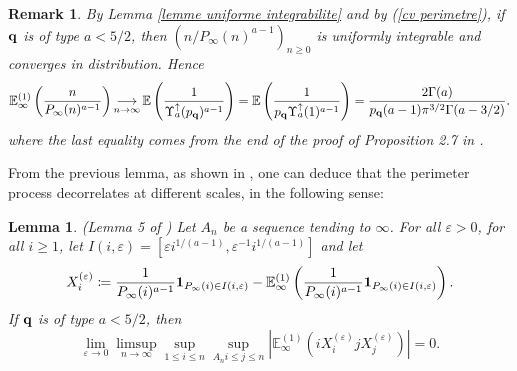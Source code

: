 \documentclass[11pt]{article}
\newtheorem{lemma}[theorem]{Lemma}
\newtheorem{remark}[theorem]{Remark}
\numberwithin{equation}{section}
\def\vp{\varepsilon}
\def\E{\mathbb{E}}
\begin{document}
\begin{remark}\label{remarque cv 1 sur P}
By Lemma \ref{lemme uniforme integrabilite} and by (\ref{cv perimetre}), if ${\bf q}$ is of type $a <5/2$, then $(n/P_\infty(n)^{a-1})_{n\ge 0}$ is uniformly integrable and converges in distribution. Hence
$$
\E^{(1)}_\infty \left(
\frac{n}{P_\infty(n)^{a-1}}
\right)
\mathop{\longrightarrow}\limits_{n\to \infty}
\E\left(
\frac{1}{\Upsilon^\uparrow_a(p_{\bf q})^{a-1}}
\right)
=\E\left(\frac{1}{p_{\bf q}\Upsilon^\uparrow_a(1)^{a-1}} \right)
=\frac{2\Gamma(a)}{p_{\bf q} (a-1) \pi^{3/2} \Gamma(a-3/2)}
.
$$
where the last equality comes from the end of the proof of Proposition 2.7 in \cite{Kam23}.
\end{remark}
From the previous lemma, as shown in \cite{BCM}, one can deduce that the perimeter process decorrelates at different scales, in the following sense:
\begin{lemma}\label{Lemme decorrelation}(Lemma 5 of \cite{BCM})
Let $A_n$ be a sequence tending to $\infty$. For all $\vp>0$, for all $i \ge 1$, let $I(i,\vp) =  [\vp i^{1/(a-1)}, \vp^{-1} i^{1/(a-1)}]$ and let
$$
X_i^{(\vp)} \coloneqq \frac{1}{P_\infty(i)^{a-1}} {\bf 1}_{P_\infty(i) \in I(i, \vp)} - \E^{(1)}_\infty \left(\frac{1}{P_\infty(i)^{a-1}} {\bf 1}_{P_\infty(i) \in I(i, \vp)}
\right).
$$
If ${\bf q}$ is of type $a<5/2$, then 
$$
\lim_{\vp \to 0} \limsup_{n\to \infty} \sup_{1\le i \le n} \sup_{A_n i \le j \le n}
\left\vert
\E^{(1)}_\infty
\left(
i X_i^{(\vp)}
j X_j^{(\vp)}
\right)
\right\vert
=0.
$$
\end{lemma}
\end{document}
